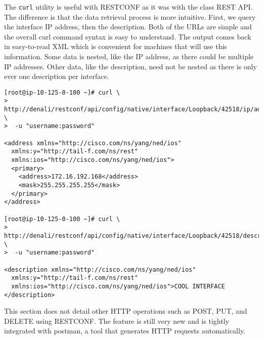 The \verb|curl| utility is useful with RESTCONF as it was with the class REST
API. The difference is that the data retrieval process is more intuitive.
First, we query the interface IP address, then the description. Both of the
URLs are simple and the overall curl command syntax is easy to understand. The
output comes back in easy-to-read XML which is convenient for machines that
will use this information. Some data is nested, like the IP address, as there
could be multiple IP addresses. Other data, like the description, need not be
nested as there is only ever one description per interface.

\begin{verbatim}
[root@ip-10-125-0-100 ~]# curl \
>  http://denali/restconf/api/config/native/interface/Loopback/42518/ip/address \
>  -u "username:password"

<address xmlns="http://cisco.com/ns/yang/ned/ios"
  xmlns:y="http://tail-f.com/ns/rest"
  xmlns:ios="http://cisco.com/ns/yang/ned/ios">
  <primary>
    <address>172.16.192.168</address>
    <mask>255.255.255.255</mask>
  </primary>
</address>

[root@ip-10-125-0-100 ~]# curl \
>  http://denali/restconf/api/config/native/interface/Loopback/42518/description \
>  -u "username:password"

<description xmlns="http://cisco.com/ns/yang/ned/ios"
  xmlns:y="http://tail-f.com/ns/rest"
  xmlns:ios="http://cisco.com/ns/yang/ned/ios">COOL INTERFACE
</description>
\end{verbatim}

This section does not detail other HTTP operations such as POST, PUT, and
DELETE using RESTCONF. The feature is still very new and is tightly integrated
with postman, a tool that generates HTTP requests automatically.
